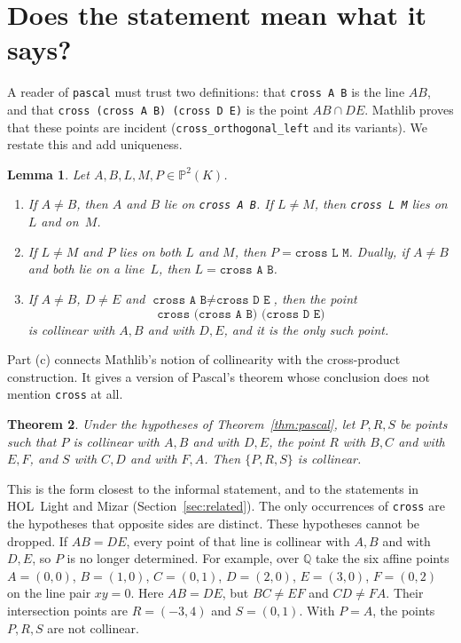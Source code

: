 \documentclass[11pt]{article}
\newtheorem{theorem}{Theorem}
\newtheorem{lemma}[theorem]{Lemma}
\theoremstyle{remark}
\newcommand{\lean}[1]{\texttt{#1}}
\newcommand{\PP}{\mathbb{P}}
\begin{document}
\section{Does the statement mean what it says?}\label{sec:correct}

A reader of \lean{pascal} must trust two definitions: that \lean{cross A B} is the line $AB$, and
that \lean{cross (cross A B) (cross D E)} is the point $AB\cap DE$. Mathlib proves that these
points are incident (\lean{cross\_orthogonal\_left} and its variants). We restate this and add
uniqueness.

\begin{lemma}\label{lem:incidence}
Let $A,B,L,M,P\in\PP^2(K)$.
\begin{enumerate}
\item[(a)] If $A\neq B$, then $A$ and $B$ lie on \lean{cross A B}. If $L\neq M$, then
\lean{cross L M} lies on $L$ and on~$M$.
\item[(b)] If $L\neq M$ and $P$ lies on both $L$ and $M$, then $P=\lean{cross L M}$. Dually, if
$A\ne B$ and both lie on a line~$L$, then $L=\lean{cross A B}$.
\item[(c)] If $A\neq B$, $D\ne E$ and $\lean{cross A B}\ne\lean{cross D E}$, then the point
\[\lean{cross (cross A B) (cross D E)}\]
is collinear with $A,B$ and with $D,E$, and it is the only
such point.
\end{enumerate}
\end{lemma}

Part (c) connects Mathlib's notion of collinearity with the cross-product construction. It gives a
version of Pascal's theorem whose conclusion does not mention \lean{cross} at all.

\begin{theorem}\label{thm:pascal-col}
Under the hypotheses of Theorem~\ref{thm:pascal}, let $P,R,S$ be points such that $P$ is
collinear with $A,B$ and with $D,E$, the point $R$ with $B,C$ and with $E,F$, and $S$ with $C,D$ and with $F,A$.
Then $\{P,R,S\}$ is collinear.
\end{theorem}

This is the form closest to the informal statement, and to the statements in HOL~Light and Mizar
(Section~\ref{sec:related}). The only occurrences of \lean{cross} are the hypotheses that opposite
sides are distinct. These hypotheses cannot be dropped. If $AB=DE$, every point of that line is
collinear with $A,B$ and with $D,E$, so $P$ is no longer determined. For example, over
$\mathbb{Q}$ take the six affine points $A=(0,0)$, $B=(1,0)$, $C=(0,1)$, $D=(2,0)$, $E=(3,0)$,
$F=(0,2)$ on the line pair $xy=0$. Here $AB=DE$, but $BC\ne EF$ and $CD\ne FA$. Their intersection
points are $R=(-3,4)$ and $S=(0,1)$. With $P=A$, the points $P,R,S$ are not collinear.
\end{document}
